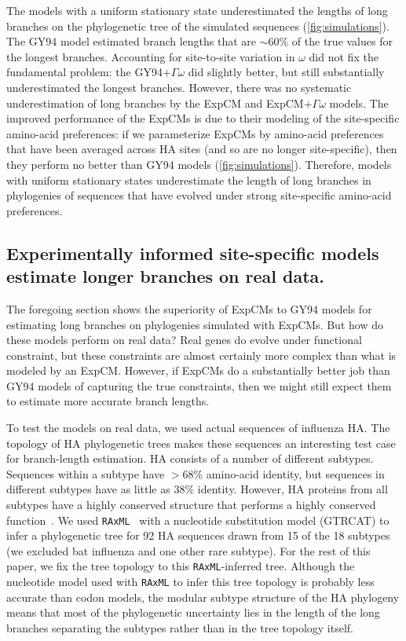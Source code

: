 \documentclass[11pt]{article}
\begin{document}
The models with a uniform stationary state underestimated the lengths of long branches on the phylogenetic tree of the simulated sequences (\ref{fig:simulations}). 
The GY94 model estimated branch lengths that are $\sim$60\% of the true values for the longest branches. 
Accounting for site-to-site variation in $\omega$ did not fix the fundamental problem: the GY94+$\Gamma\omega$ did slightly better, but still substantially underestimated the longest branches.
However, there was no systematic underestimation of long branches by the ExpCM and ExpCM+$\Gamma\omega$ models.
The improved performance of the ExpCMs is due to their modeling of the site-specific amino-acid preferences: if we parameterize ExpCMs by amino-acid preferences that have been averaged across HA sites (and so are no longer site-specific), then they perform no better than GY94 models (\ref{fig:simulations}).
Therefore, models with uniform stationary states underestimate the length of long branches in phylogenies of sequences that have evolved under strong site-specific amino-acid preferences.


\subsection*{Experimentally informed site-specific models estimate longer branches on real data.}

The foregoing section shows the superiority of ExpCMs to GY94 models for estimating long branches on phylogenies simulated with ExpCMs.
But how do these models perform on real data?
Real genes do evolve under functional constraint, but these constraints are almost certainly more complex than what is modeled by an ExpCM.
However, if ExpCMs do a substantially better job than GY94 models of capturing the true constraints, then we might still expect them to estimate more accurate branch lengths.

To test the models on real data, we used actual sequences of influenza HA. 
The topology of HA phylogenetic trees makes these sequences an interesting test case for branch-length estimation.
HA consists of a number of different subtypes.
Sequences within a subtype have $>$68\% amino-acid identity, but sequences in different subtypes have as little as 38\% identity.
However, HA proteins from all subtypes have a highly conserved structure that performs a highly conserved function~\citep{ha2002h5,russell2004h1}.
We used \texttt{RAxML}~\citep{stamatakis2006raxml} with a nucleotide substitution model  (GTRCAT) to infer a phylogenetic tree for 92 HA sequences drawn from 15 of the 18 subtypes (we excluded bat influenza and one other rare subtype).
For the rest of this paper, we fix the tree topology to this \texttt{RAxML}-inferred tree.
Although the nucleotide model used with \texttt{RAxML} to infer this tree topology is probably less accurate than codon models, the modular subtype structure of the HA phylogeny means that most of the phylogenetic uncertainty lies in the length of the long branches separating the subtypes rather than in the tree topology itself.
\end{document}
